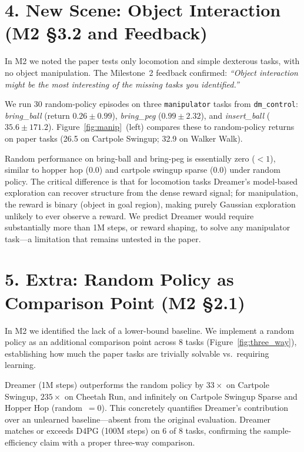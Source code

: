 \documentclass[10pt,twocolumn]{article}
\begin{document}
\section{4. New Scene: Object Interaction (M2 \S3.2 and Feedback)}

In M2 we noted the paper tests only locomotion and simple dexterous
tasks, with no object manipulation.  The Milestone~2 feedback
confirmed: \textit{``Object interaction might be the most
interesting of the missing tasks you identified.''}

We run 30 random-policy episodes on three \texttt{manipulator}
tasks from \texttt{dm\_control}: \textit{bring\_ball}
(return $0.26\pm0.99$), \textit{bring\_peg} ($0.99\pm2.32$),
and \textit{insert\_ball} ($35.6\pm171.2$).
Figure~\ref{fig:manip}~(left) compares these to random-policy returns
on paper tasks (26.5 on Cartpole Swingup; 32.9 on Walker Walk).

Random performance on bring-ball and bring-peg is essentially zero
($<1$), similar to hopper hop (0.0) and cartpole swingup sparse
(0.0) under random policy.  The critical difference is that for
locomotion tasks Dreamer's model-based exploration can recover
structure from the dense reward signal; for manipulation, the reward
is binary (object in goal region), making purely Gaussian exploration
unlikely to ever observe a reward.  We predict Dreamer would require
substantially more than 1M steps, or reward shaping, to solve any
manipulator task---a limitation that remains untested in the paper.

\section{5. Extra: Random Policy as Comparison Point (M2 \S2.1)}

In M2 we identified the lack of a lower-bound baseline.  We
implement a random policy as an additional comparison point across 8
tasks (Figure~\ref{fig:three_way}), establishing how much the paper
tasks are trivially solvable vs.\ requiring learning.

Dreamer (1M steps) outperforms the random policy by $33\times$ on
Cartpole Swingup, $235\times$ on Cheetah Run, and infinitely on
Cartpole Swingup Sparse and Hopper Hop (random~$=0$).  This
concretely quantifies Dreamer's contribution over an unlearned
baseline---absent from the original evaluation.  Dreamer matches or
exceeds D4PG (100M steps) on 6 of 8 tasks, confirming the
sample-efficiency claim with a proper three-way comparison.
\end{document}
